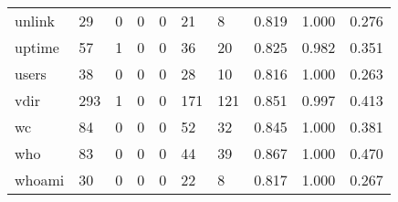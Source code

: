 \begin{longtable}{lp{1.3cm}p{1.3cm}p{1.3cm}p{1.3cm}p{1.3cm}p{1.3cm}p{1.3cm}p{1.3cm}p{1.3cm}}
unlink    &                     29 &                                             0 &                                            0 &                                           0 &                                           21 &                                          8 &                                0.819 &                                  1.000 &                                0.276 \\
uptime    &                     57 &                                             1 &                                            0 &                                           0 &                                           36 &                                         20 &                                0.825 &                                  0.982 &                                0.351 \\
users     &                     38 &                                             0 &                                            0 &                                           0 &                                           28 &                                         10 &                                0.816 &                                  1.000 &                                0.263 \\
vdir      &                    293 &                                             1 &                                            0 &                                           0 &                                          171 &                                        121 &                                0.851 &                                  0.997 &                                0.413 \\
wc        &                     84 &                                             0 &                                            0 &                                           0 &                                           52 &                                         32 &                                0.845 &                                  1.000 &                                0.381 \\
who       &                     83 &                                             0 &                                            0 &                                           0 &                                           44 &                                         39 &                                0.867 &                                  1.000 &                                0.470 \\
whoami    &                     30 &                                             0 &                                            0 &                                           0 &                                           22 &                                          8 &                                0.817 &                                  1.000 &                                0.267 \\

\end{longtable}
